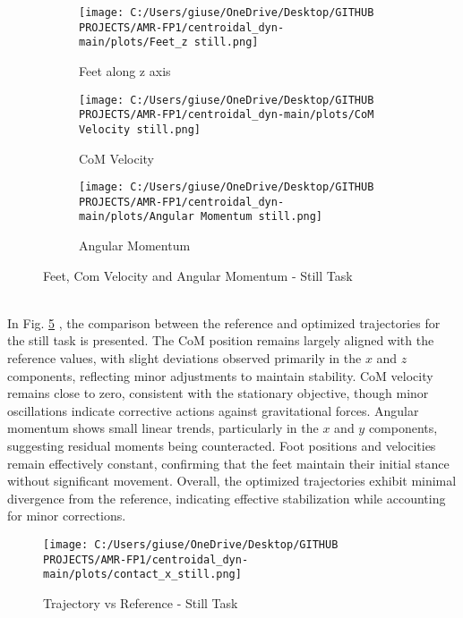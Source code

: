 \documentclass[main.tex]{subfiles}
\begin{document}
\begin{figure}[htbp]
    \centering
    \begin{subfigure}[b]{0.32\textwidth}
        \centering
        \texttt{[image: C:/Users/giuse/OneDrive/Desktop/GITHUB PROJECTS/AMR-FP1/centroidal\_dyn-main/plots/Feet\_z still.png]}
        \caption{Feet along z axis}
        \label{fig:feet_z_still}
    \end{subfigure}
    \hfill
    \begin{subfigure}[b]{0.32\textwidth}
        \centering
        \texttt{[image: C:/Users/giuse/OneDrive/Desktop/GITHUB PROJECTS/AMR-FP1/centroidal\_dyn-main/plots/CoM Velocity still.png]}
        \caption{CoM Velocity}
        \label{fig:com_velocity_still}
    \end{subfigure}
    \hfill
    \begin{subfigure}[b]{0.32\textwidth}
        \centering
        \texttt{[image: C:/Users/giuse/OneDrive/Desktop/GITHUB PROJECTS/AMR-FP1/centroidal\_dyn-main/plots/Angular Momentum still.png]}
        \caption{Angular Momentum}
        \label{fig:angular_momentum_still}
    \end{subfigure}
    \caption{Feet, Com Velocity and Angular Momentum - Still Task}
    \label{fig:three_still}
\end{figure}
\\
In Fig. \ref{fig:comparison_still} , the comparison between the reference and optimized trajectories for the still task is presented. The CoM position remains largely aligned with the reference values, with slight deviations observed primarily in the $x$ and $z$ components, reflecting minor adjustments to maintain stability. CoM velocity remains close to zero, consistent with the stationary objective, though minor oscillations indicate corrective actions against gravitational forces. Angular momentum shows small linear trends, particularly in the $x$ and $y$ components, suggesting residual moments being counteracted. Foot positions and velocities remain effectively constant, confirming that the feet maintain their initial stance without significant movement. Overall, the optimized trajectories exhibit minimal divergence from the reference, indicating effective stabilization while accounting for minor corrections.
\begin{figure}[htbp]
    \centering
    \texttt{[image: C:/Users/giuse/OneDrive/Desktop/GITHUB PROJECTS/AMR-FP1/centroidal\_dyn-main/plots/contact\_x\_still.png]}
    \caption{Trajectory vs Reference - Still Task}
    \label{fig:comparison_still}
\end{figure}
\end{document}
